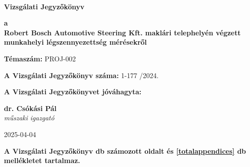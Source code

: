 \documentclass[a4paper,12pt]{article}
\begin{document}
	
	
	\thispagestyle{firstpage}
	
	\begin{flushleft}
		{\footnotesize  
			\textbf{
				 \\
				\vspace{-2mm} 
			}
		}
	\end{flushleft}
	
	\vfill
	
	\begin{center}
		{\Huge \textbf{Vizsgálati Jegyzőkönyv}}
	\end{center}
	
	\vfill
	
	\begin{center}
		\large
		\textbf{a} \\
		\textbf{Robert Bosch Automotive Steering Kft. maklári telephelyén
végzett munkahelyi légszennyezettség mérésekről}
	\end{center}
	
	\vfill
	
	\begin{center}
		\textbf{Témaszám:} PROJ-002
	\end{center}    
	
	\vfill
	
	\begin{center}
		\textbf{A Vizsgálati Jegyzőkönyv száma:} 1-177 /2024.
	\end{center}
	
	\begin{center}
		\textbf{A Vizsgálati Jegyzőkönyvet jóváhagyta:}
	\end{center}    
	
	\vfill
	
	\begin{center}
		\textbf{dr. Csókási Pál}\\
		\textit{műszaki igazgató} \\
	\end{center}    
	
	\vfill
	
	\begin{center}
		2025-04-04
	\end{center}    
	
	\vfill
	
	\begin{center}
		\textbf{A Vizsgálati Jegyzőkönyv \pageref{LastPage} db számozott oldalt és \ref{totalappendices} db mellékletet tartalmaz.}
	\end{center}    
	
\end{document}
